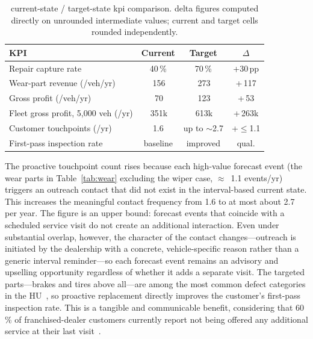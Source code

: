 \documentclass[conference,a4paper]{IEEEtran}
\newcommand{\eur}{\ifmmode\text{\texteuro}\else\texteuro\fi}
\begin{document}
\begin{table}[h!]
\caption{current-state / target-state kpi comparison. delta figures computed directly on unrounded intermediate values; current and target cells rounded independently.}
\label{tab:kpi}
\centering
\small
\begin{tabularx}{\columnwidth}{@{} >{\raggedright\arraybackslash}X c c c @{}}
\toprule
\textbf{KPI} & \textbf{Current} & \textbf{Target} & \textbf{$\Delta$} \\
\midrule
Repair capture rate              & 40\,\%     & 70\,\%      & +30\,pp \\
Wear-part revenue (/veh/yr)      & \eur\,156  & \eur\,273   & +\eur\,117 \\
Gross profit (/veh/yr)           & \eur\,70   & \eur\,123   & +\eur\,53 \\
Fleet gross profit, 5{,}000 veh (/yr) & \eur\,351k & \eur\,613k  & +\eur\,263k \\
Customer touchpoints (/yr)       & 1.6        & up to $\sim$2.7 & +$\leq$1.1 \\
First-pass inspection rate       & baseline   & improved    & qual. \\
\bottomrule
\end{tabularx}
\end{table}
 
The proactive touchpoint count rises because each high-value forecast event
(the wear parts in Table~\ref{tab:wear} excluding the wiper case,
$\approx$~1.1 events/yr) triggers an outreach contact that did not exist in
the interval-based current state. This increases the meaningful contact
frequency from 1.6 to at most about 2.7 per year. The figure is an upper
bound: forecast events that coincide with a scheduled service visit do not
create an additional interaction. Even under substantial overlap, however,
the character of the contact changes---outreach is initiated by the
dealership with a concrete, vehicle-specific reason rather than a generic
interval reminder---so each forecast event remains an advisory and upselling
opportunity regardless of whether it adds a separate visit. The
targeted parts---brakes and tires above all---are among the most common
defect categories in the HU~\cite{tuev2026report}, so proactive replacement directly improves the customer's first-pass inspection rate. This is a tangible and communicable benefit, considering that 60\,\% of
franchised-dealer customers currently report not being offered any
additional service at their last visit~\cite{dat2026report}.
 
\end{document}
